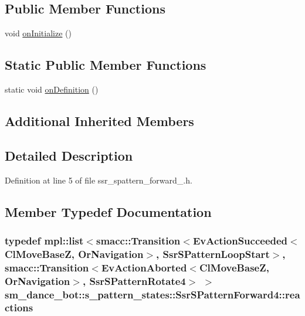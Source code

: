 \subsection*{Public Member Functions}
\begin{DoxyCompactItemize}
\item 
void \hyperlink{structsm__dance__bot_1_1s__pattern__states_1_1SsrSPatternForward4_a14110b901b410e498910f43a2de1abab}{on\+Initialize} ()
\end{DoxyCompactItemize}
\subsection*{Static Public Member Functions}
\begin{DoxyCompactItemize}
\item 
static void \hyperlink{structsm__dance__bot_1_1s__pattern__states_1_1SsrSPatternForward4_aec2d3cb87dcee38f5c7f5273b89153d4}{on\+Definition} ()
\end{DoxyCompactItemize}
\subsection*{Additional Inherited Members}


\subsection{Detailed Description}


Definition at line 5 of file ssr\+\_\+spattern\+\_\+forward\+\_.\+h.



\subsection{Member Typedef Documentation}
\subsubsection[{\texorpdfstring{reactions}{reactions}}]{\setlength{\rightskip}{0pt plus 5cm}typedef mpl\+::list$<${\bf smacc\+::\+Transition}$<$Ev\+Action\+Succeeded$<${\bf Cl\+Move\+BaseZ}, {\bf Or\+Navigation}$>$, {\bf Ssr\+S\+Pattern\+Loop\+Start}$>$, {\bf smacc\+::\+Transition}$<$Ev\+Action\+Aborted$<${\bf Cl\+Move\+BaseZ}, {\bf Or\+Navigation}$>$, {\bf Ssr\+S\+Pattern\+Rotate4}$>$ $>$ {\bf sm\+\_\+dance\+\_\+bot\+::s\+\_\+pattern\+\_\+states\+::\+Ssr\+S\+Pattern\+Forward4\+::reactions}}\hypertarget{structsm__dance__bot_1_1s__pattern__states_1_1SsrSPatternForward4_a40359cc1c5b517f1873b017f2ad37dc6}{}\label{structsm__dance__bot_1_1s__pattern__states_1_1SsrSPatternForward4_a40359cc1c5b517f1873b017f2ad37dc6}


